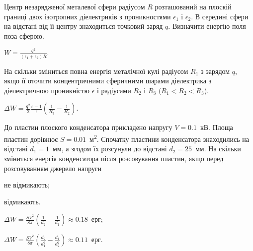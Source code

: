 \begin{problem}
Центр незарядженої металевої сфери радіусом $R$ розташований на плоскій границі двох ізотропних діелектриків з проникностями $\epsilon_1$ і $\epsilon_2$. В середині сфери на відстані від її центру знаходиться точковий заряд $q$. Визначити енергію поля поза сферою.
\begin{solution}
	$W = \frac{q^2}{(\epsilon_1 + \epsilon_2)R}$.
\end{solution}
\end{problem}

\begin{problem}
На скільки зміниться повна енергія металічної кулі радіусом $R_1$ з зарядом $q$, якщо її оточити концентричними сферичними шарами діелектрика з діелектричною проникністю $\epsilon$ і радіусами $R_2$ і $R_3$ ($R_1<R_2<R_3$).
\begin{solution}
	$\Delta W = \frac{q^2}{2}\frac{\epsilon - 1}{\epsilon} \left( \frac{1}{R_3} - \frac{1}{R_2} \right) $.
\end{solution}
\end{problem}

\begin{problem}
    До пластин плоского конденсатора прикладено напругу $V = 0.1$~кВ. Площа пластин дорівнює $S = 0.01$~м\textsuperscript{2}. Спочатку пластини конденсатора знаходились на відстані $d_1 = 1$~мм, а згодом їх розсунули до відстані $d_2 = 25$~мм. На скільки зміниться енергія конденсатора після розсовування пластин, якщо перед розсовуванням джерело напруги
	\begin{enumerate*}[label=\alph*)]
		\item не відмикають;
		\item відмикають.
	\end{enumerate*}
\begin{solution}
	\begin{enumerate*}[label=\alph*)]
		\item $\Delta W = \frac{SV^2}{8\pi}\left( \frac{1}{d_2} - \frac{1}{d_1}\right) \approx 0.18$~ерг;
		\item $\Delta W = \frac{SV^2}{8\pi}\left( \frac{d_2}{d_1^2} - \frac{d_1}{d_2^2}\right) \approx 0.11$~ерг.
	\end{enumerate*}
\end{solution}
\end{problem}

